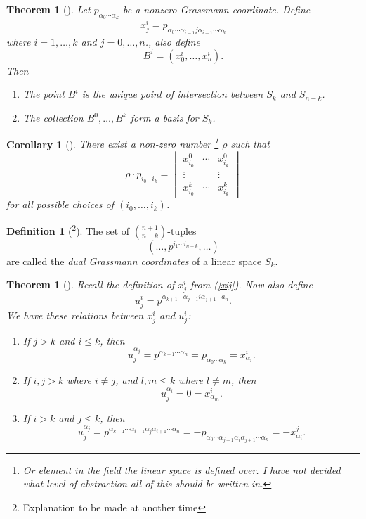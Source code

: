 \documentclass[a4paper,12pt]{book}
\theoremstyle{plain}
\newtheorem{thm}[equation]{Theorem}
\newtheorem{Corollary}[equation]{Corollary}
\theoremstyle{definition}
\newtheorem{defi}[equation]{Definition}
\begin{document}
\begin{thm}[\cite{MR0028055}]
	Let \( p_{\alpha_0 \cdots \alpha_k} \) be a nonzero Grassmann coordinate. Define
	\begin{equation}
		\label{xij}
		x_j^i = p_{\alpha_0 \cdots \alpha_{i-1} j \alpha_{i+1} \cdots \alpha_k}
	\end{equation}
	where \( i = 1, \ldots, k \) and \( j = 0, \ldots, n \)., also define
	\[
		B^i = (x_0^i, \ldots, x_n^i).
	\]
	Then
	\begin{enumerate}
		\item The point \( B^i \) is the unique point of intersection between \( S_k \) and
		\( S_{n-k} \).
		\item The collection \( B^0, \ldots, B^k \) form a basis for \( S_k \).
	\end{enumerate}
\end{thm}

\begin{Corollary}[\cite{MR0028055}]
	There exist a non-zero number
	\footnote{Or element in the field the linear space is defined over. I have not decided what
	level of abstraction all of this should be written in.}
	\( \rho \) such that
	\[
		\rho \cdot p_{i_0 \cdots i_k} =
		\begin{vmatrix}
			x_{i_0}^0 & \cdots & x_{i_k}^0 \\
			\vdots & & \vdots \\
			x_{i_0}^k & \cdots & x_{i_k}^k
		\end{vmatrix}
	\]
	for all possible choices of \( (i_0, \ldots, i_k) \).
\end{Corollary}

\begin{defi}[\footnote{Explanation to be made at another time}]
	The set of \( {n+1} \choose {n-k} \)-tuples
	\[
		(\ldots, p^{i_1 \cdots i_{n-k}}, \ldots)
	\]
	are called the \emph{dual Grassmann coordinates} of a linear space \( S_k \).
\end{defi}

\begin{thm}[\cite{MR0028055}]
	Recall the definition of \( x_j^i \) from (\ref{xij}). Now also define
	\[
		u_j^i = p^{\alpha_{k+1} \cdots \alpha_{j-1} i \alpha_{j+1} \cdots a_n}.
	\]
	We have these relations between \( x_j^i \) and \( u_j^i \):
	\begin{enumerate}
		\item If \( j > k \) and \( i \leq k \), then
		\[
			u_j^{\alpha_j} = p^{\alpha_{k+1} \cdots \alpha_n} =
			p_{\alpha_0 \cdots \alpha_k} = x_{\alpha_i}^i .
		\]
		\item If \( i,j > k \) where \( i \neq j \), and \( l,m \leq k \) where \( l \neq m \), then
		\[
			u_j^{\alpha_i} = 0 = x_{\alpha_m}^i .
		\]
		\item If \( i > k \) and \( j \leq k \), then
		\[
			u_j^{\alpha_j} = p^{\alpha_{k+1} \cdots \alpha_{i-1} \alpha_j \alpha_{i+1}
			\cdots \alpha_n} = -p_{\alpha_0 \cdots \alpha_{j-1} \alpha_i \alpha_{j+1}
			\cdots \alpha_n} = -x_{\alpha_i}^j .
		\]
	\end{enumerate}
\end{thm}
\end{document}
